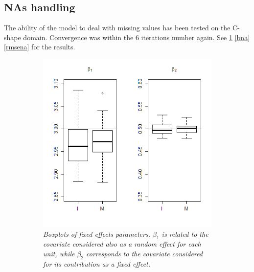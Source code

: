 \subsection{NAs handling}
The ability of the model to deal with missing values has been tested on the
C-shape domain. Convergence was within the 6 iterations number again. See
\ref{betana} \ref{bna} \ref{rmsena} for the results.
\begin{figure}
	\centering
	\begin{subfigure}{0.45\textwidth}
		\includegraphics[width=\textwidth]{images/betana.png}
		\centering
		\caption{\textit{Boxplots of fixed effects parameters. $\beta_1$ is related to the covariate considered also as a random effect for each unit, while $\beta_2$ corresponds to the covariate considered for its contribution
				as a fixed effect.}}
		\label{betana}
	\end{subfigure}
	\hfill
	\begin{subfigure}{0.45\textwidth}

\end{subfigure}
\end{figure}
